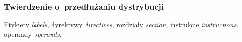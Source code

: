 \documentclass[10pt,t]{beamer}
\begin{document}
\begin{frame}
  \frametitle{Twierdzenie o~przedłużaniu dystrybucji}


  Etykiety \textit{labels}, dyrektywy \textit{directives}, rozdziały
  \textit{section}, instrukcje \textit{instructions}, operandy
  \textit{operands}.

\end{frame}










































\end{document}

